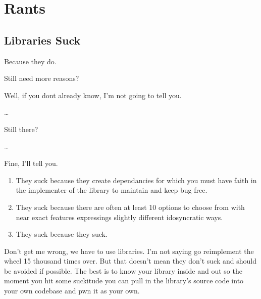 \chapter{Rants}
\section{Libraries Suck}
\label{rant:librariessuck}
\par
Because they do.
\par
Still need more reasons?
\par
Well, if you dont already know, I'm not going to tell you.
\par
\dots
\par
Still there?
\par
\dots
\par
Fine, I'll tell you.
\begin{enumerate}
    \item They suck because they create dependancies for which you must have faith in the implementer of the library to maintain and keep bug free.
    \item They suck because there are often at least 10 options to choose from with near exact features expressings slightly different idosyncratic ways.
    \item They suck because they suck.
\end{enumerate}
Don't get me wrong, we have to use libraries. I'm not saying go reimplement the wheel 15 thousand times over. But that doesn't mean they don't suck and should be avoided if possible. The best is to know your library inside and out so the moment you hit some suckitude you can pull in the library's source code into your own codebase and \gls{pwn} it as your own.